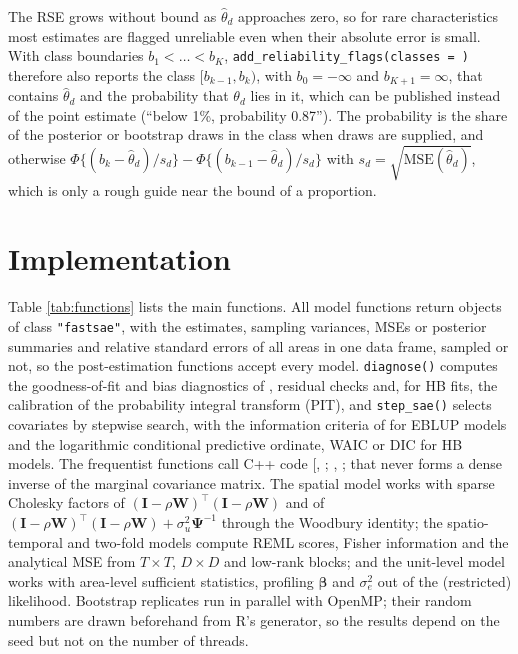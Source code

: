 The RSE grows without bound as \(\hat{\theta}_d\) approaches zero, so for rare characteristics most estimates are flagged unreliable even when their absolute error is small. With class boundaries \(b_1 < \dots < b_K\), \texttt{add\_reliability\_flags(classes\ =\ )} therefore also reports the class \([b_{k-1}, b_k)\), with \(b_0 = -\infty\) and \(b_{K+1} = \infty\), that contains \(\hat{\theta}_d\) and the probability that \(\theta_d\) lies in it, which can be published instead of the point estimate (``below 1\%, probability 0.87''). The probability is the share of the posterior or bootstrap draws in the class when draws are supplied, and otherwise \(\Phi\{(b_k - \hat{\theta}_d)/s_d\} - \Phi\{(b_{k-1} - \hat{\theta}_d)/s_d\}\) with \(s_d = \sqrt{\mathrm{MSE}(\hat{\theta}_d)}\), which is only a rough guide near the bound of a proportion.

\section{Implementation}\label{sec:design}

Table \ref{tab:functions} lists the main functions. All model functions return objects of class \texttt{"fastsae"}, with the estimates, sampling variances, MSEs or posterior summaries and relative standard errors of all areas in one data frame, sampled or not, so the post-estimation functions accept every model. \texttt{diagnose()} computes the goodness-of-fit and bias diagnostics of \citet{brown2001evaluation}, residual checks and, for HB fits, the calibration of the probability integral transform (PIT), and \texttt{step\_sae()} selects covariates by stepwise search, with the information criteria of \citet{marhuenda2014information} for EBLUP models and the logarithmic conditional predictive ordinate, WAIC or DIC for HB models. The frequentist functions call C++ code {[}, \citet{eddelbuettel2011rcpp}; , \citet{eddelbuettel2014rcpparmadillo}; \CRANpkg{RcppEigen}{]} that never forms a dense inverse of the marginal covariance matrix. The spatial model works with sparse Cholesky factors of \((\boldsymbol{I} - \rho\boldsymbol{W})^\top(\boldsymbol{I} - \rho\boldsymbol{W})\) and of \((\boldsymbol{I} - \rho\boldsymbol{W})^\top(\boldsymbol{I} - \rho\boldsymbol{W}) + \sigma_u^2\boldsymbol{\Psi}^{-1}\) through the Woodbury identity; the spatio-temporal and two-fold models compute REML scores, Fisher information and the analytical MSE from \(T \times T\), \(D \times D\) and low-rank blocks; and the unit-level model works with area-level sufficient statistics, profiling \(\boldsymbol{\beta}\) and \(\sigma_e^2\) out of the (restricted) likelihood. Bootstrap replicates run in parallel with OpenMP; their random numbers are drawn beforehand from R's generator, so the results depend on the seed but not on the number of threads.

